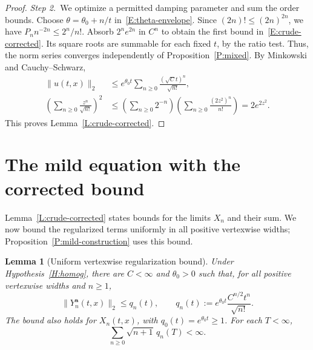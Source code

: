 \documentclass[12pt,oneside,openany]{book}
\makeatletter
\let\lean@pending\@empty
\newcommand{\LeanMarker}[1]{\gdef\lean@pending{#1}}
\numberwithin{equation}{section}
\newtheorem{lemma}[theorem]{Lemma}
\theoremstyle{nogostyle}
\theoremstyle{definition}
\makeatother
\begin{document}
\begin{proof}
  \medskip
  \noindent\textit{Step 2.~}We optimize a permitted damping parameter and sum
  the order bounds.
  Choose $\theta = \theta_0+n/t$ in~\eqref{E:theta-envelope}. Since $(2n)! \le
  (2n)^{2n}$, we have $P_n n^{-2n} \le 2^n/n!$. Absorb $2^ne^{2n}$ in $C^n$ to
  obtain the first bound in~\eqref{E:crude-corrected}. Its square roots are
  summable for each fixed $t$, by the ratio test. Thus, the norm series
  converges independently of Proposition~\ref{P:mixed}. By Minkowski and
  Cauchy--Schwarz,
  \[
    \begin{split}
      \|u(t,x)\|_2
      &\le e^{\theta_0t}\sum_{n\ge0}\frac{(\sqrt C t)^n}{\sqrt{n!}},\\
      \left(\sum_{n\ge0}\frac{z^n}{\sqrt{n!}}\right)^2
      &\le\left(\sum_{n\ge0}2^{-n}\right)
      \left(\sum_{n\ge0}\frac{(2z^2)^n}{n!}\right)
      =2e^{2z^2}.
    \end{split}
  \]
  This proves Lemma~\ref{L:crude-corrected}.
\end{proof}

\section{The mild equation with the corrected bound}

Lemma~\ref{L:crude-corrected} states bounds for the limits $X_n$ and their
sum. We now bound the regularized terms uniformly in all positive vertexwise
widths; Proposition~\ref{P:mild-construction} uses this bound.
\LeanMarker{L:vertex-crude}%
\begin{lemma}[Uniform vertexwise regularization bound]\label{L:vertex-crude}
  Under Hypothesis~\ref{H:homog}, there are $C < \infty$ and $\theta_0 > 0$ such
  that, for all positive vertexwise widths and $n \ge 1$,
  \begin{equation}\label{E:vertex-crude}
    \|Y_n^{\boldsymbol a}(t,x)\|_2\le q_n(t),\qquad
    q_n(t):=e^{\theta_0t}\frac{C^{n/2}t^n}{\sqrt{n!}}.
  \end{equation}
  The bound also holds for $X_n(t,x)$, with $q_0(t) = e^{\theta_0t} \ge 1$. For
  each $T < \infty$,
  \begin{equation}\label{E:vertex-summability}
    \sum_{n\ge0}\sqrt{n+1}\,q_n(T)<\infty.
  \end{equation}
\end{lemma}
\end{document}
